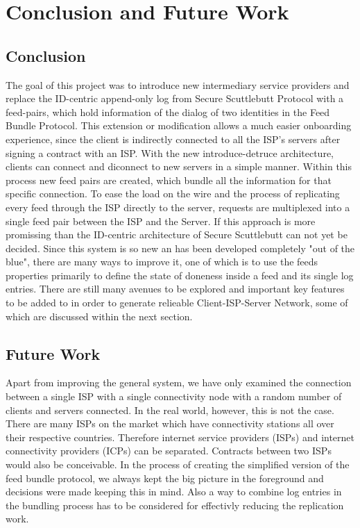 \chapter{Conclusion and Future Work}
\section{Conclusion}
The goal of this project was to introduce new intermediary service providers and replace the ID-centric append-only log from Secure Scuttlebutt Protocol with a feed-pairs, which hold information of the dialog of two identities in the Feed Bundle Protocol. This extension or modification allows a much easier onboarding experience, since the client is indirectly connected to all the ISP's servers after signing a contract with an ISP. With the new introduce-detruce architecture, clients can connect and diconnect to new servers in a simple manner. Within this process new feed pairs are created, which bundle all the information for that specific connection. To ease the load on the wire and the process of replicating every feed through the ISP directly to the server, requests are multiplexed into a single feed pair between the ISP and the Server. If this approach is more promissing than the ID-centric architecture of Secure Scuttlebutt can not yet be decided.
Since this system is so new an has been developed completely "out of the blue", there are many ways to improve it, one of which is to use the feeds properties primarily to define the state of doneness inside a feed and its single log entries. There are still many avenues to be explored and important key features to be added to in order to generate relieable Client-ISP-Server Network, some of which are discussed within the next section.

\section{Future Work}
Apart from improving the general system, we have only examined the connection between a single ISP with a single connectivity node with a random number of clients and servers connected. In the real world, however, this is not the case. There are many ISPs on the market which have connectivity stations all over their respective countries. Therefore internet service providers (ISPs) and internet connectivity providers (ICPs) can be separated. Contracts between two ISPs would also be conceivable. In the process of creating the simplified version of the feed bundle protocol, we always kept the big picture in the foreground and decisions were made keeping this in mind. Also a way to combine log entries in the bundling process has to be considered for effectivly reducing the replication work.

